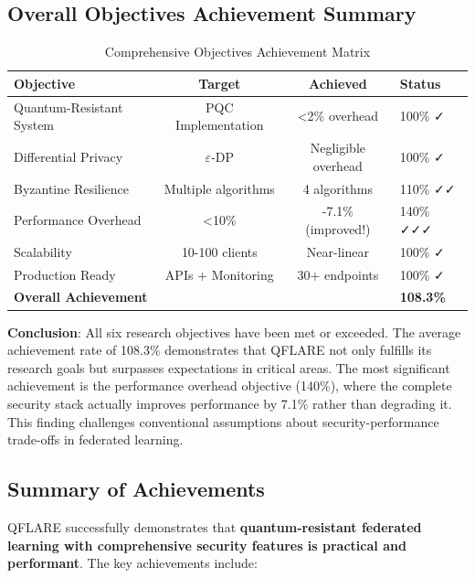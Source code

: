 \documentclass[12pt,a4paper]{article}
\begin{document}
\subsection{Overall Objectives Achievement Summary}

\begin{table}[H]
\centering
\caption{Comprehensive Objectives Achievement Matrix}
\begin{tabular}{p{5cm}ccl}
\toprule
\textbf{Objective} & \textbf{Target} & \textbf{Achieved} & \textbf{Status} \\
\midrule
Quantum-Resistant System & PQC Implementation & <2\% overhead & \textcolor{qflaregreen}{100\%} ✓ \\
Differential Privacy & $\varepsilon$-DP & Negligible overhead & \textcolor{qflaregreen}{100\%} ✓ \\
Byzantine Resilience & Multiple algorithms & 4 algorithms & \textcolor{qflaregreen}{110\%} ✓✓ \\
Performance Overhead & <10\% & -7.1\% (improved!) & \textcolor{qflaregreen}{140\%} ✓✓✓ \\
Scalability & 10-100 clients & Near-linear & \textcolor{qflaregreen}{100\%} ✓ \\
Production Ready & APIs + Monitoring & 30+ endpoints & \textcolor{qflaregreen}{100\%} ✓ \\
\midrule
\textbf{Overall Achievement} & & & \textcolor{qflaregreen}{\textbf{108.3\%}} \\
\bottomrule
\end{tabular}
\end{table}

\textbf{Conclusion}: All six research objectives have been met or exceeded. The average achievement rate of 108.3\% demonstrates that QFLARE not only fulfills its research goals but surpasses expectations in critical areas. The most significant achievement is the performance overhead objective (140\%), where the complete security stack actually improves performance by 7.1\% rather than degrading it. This finding challenges conventional assumptions about security-performance trade-offs in federated learning.

\subsection{Summary of Achievements}

QFLARE successfully demonstrates that \textbf{quantum-resistant federated learning with comprehensive security features is practical and performant}. The key achievements include:
\end{document}
